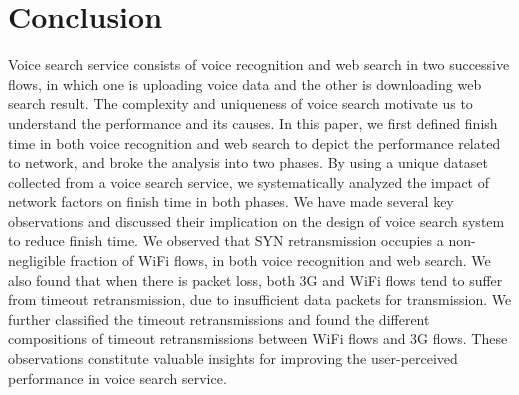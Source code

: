 
\section{Conclusion}
\label{sec:conclude}

Voice search service consists of voice recognition and web search in two successive flows, in which one is uploading voice data and the other is downloading web search result. The complexity and uniqueness of voice search motivate us to understand the performance and its causes. In this paper, we first defined finish time in both voice recognition and web search to depict the performance related to network, and broke the analysis into two phases. By using a unique dataset collected from a voice search service, we systematically analyzed the impact of network factors on finish time in both phases. We have made several key observations and discussed their implication on the design of voice search system to reduce finish time. We observed that SYN retransmission occupies a non-negligible fraction of WiFi flows, in both voice recognition and web search. We also found that when there is packet loss, both 3G and WiFi flows tend to suffer from timeout retransmission, due to insufficient data packets for transmission. We further classified the timeout retransmissions and found the different compositions of timeout retransmissions between WiFi flows and 3G flows. These observations constitute valuable insights for improving the user-perceived performance in voice search service.